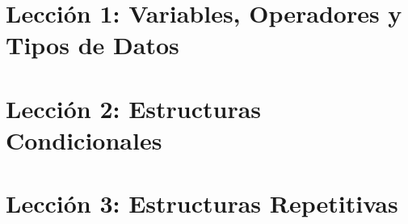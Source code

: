 \section{Lección 1: Variables, Operadores y Tipos de Datos}
\section{Lección 2: Estructuras Condicionales}
\section{Lección 3: Estructuras Repetitivas}